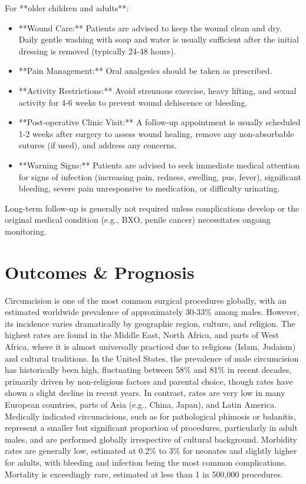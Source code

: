 For **older children and adults**:
\begin{itemize}
  \item **Wound Care:** Patients are advised to keep the wound clean and dry. Daily gentle washing with soap and water is usually sufficient after the initial dressing is removed (typically 24-48 hours).
  \item **Pain Management:** Oral analgesics should be taken as prescribed.
  \item **Activity Restrictions:** Avoid strenuous exercise, heavy lifting, and sexual activity for 4-6 weeks to prevent wound dehiscence or bleeding.
  \item **Post-operative Clinic Visit:** A follow-up appointment is usually scheduled 1-2 weeks after surgery to assess wound healing, remove any non-absorbable sutures (if used), and address any concerns.
  \item **Warning Signs:** Patients are advised to seek immediate medical attention for signs of infection (increasing pain, redness, swelling, pus, fever), significant bleeding, severe pain unresponsive to medication, or difficulty urinating.
\end{itemize}
Long-term follow-up is generally not required unless complications develop or the original medical condition (e.g., BXO, penile cancer) necessitates ongoing monitoring.

\section*{Outcomes \& Prognosis}
Circumcision is one of the most common surgical procedures globally, with an estimated worldwide prevalence of approximately 30-33\% among males. However, its incidence varies dramatically by geographic region, culture, and religion. The highest rates are found in the Middle East, North Africa, and parts of West Africa, where it is almost universally practiced due to religious (Islam, Judaism) and cultural traditions. In the United States, the prevalence of male circumcision has historically been high, fluctuating between 58\% and 81\% in recent decades, primarily driven by non-religious factors and parental choice, though rates have shown a slight decline in recent years. In contrast, rates are very low in many European countries, parts of Asia (e.g., China, Japan), and Latin America. Medically indicated circumcisions, such as for pathological phimosis or balanitis, represent a smaller but significant proportion of procedures, particularly in adult males, and are performed globally irrespective of cultural background. Morbidity rates are generally low, estimated at 0.2\% to 3\% for neonates and slightly higher for adults, with bleeding and infection being the most common complications. Mortality is exceedingly rare, estimated at less than 1 in 500,000 procedures.


